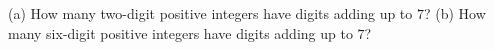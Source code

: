 (a) How many two-digit positive integers have digits adding up to $7$? (b) How many six-digit positive integers have digits adding up to $7$?

